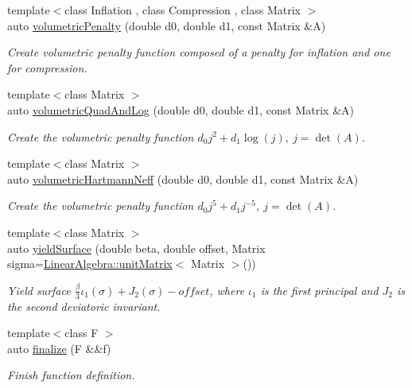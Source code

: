 \begin{DoxyCompactItemize}
{\footnotesize template$<$class Inflation , class Compression , class Matrix $>$ }\\auto \hyperlink{namespaceFunG_ad26faeb264bb4b1cd7e70f3811c366c8}{volumetric\-Penalty} (double d0, double d1, const Matrix \&A)
\begin{DoxyCompactList}\small\item\em Create volumetric penalty function composed of a penalty for inflation and one for compression. \end{DoxyCompactList}\item 
{\footnotesize template$<$class Matrix $>$ }\\auto \hyperlink{namespaceFunG_aaf30b9c36ed86e01b94f6b7c1d95cae8}{volumetric\-Quad\-And\-Log} (double d0, double d1, const Matrix \&A)
\begin{DoxyCompactList}\small\item\em Create the volumetric penalty function $ d_0 j^2 + d_1 \log(j),\ j=\det(A) $. \end{DoxyCompactList}\item 
{\footnotesize template$<$class Matrix $>$ }\\auto \hyperlink{namespaceFunG_adf4be5df85ea9df10cc9e11c11aaeb7b}{volumetric\-Hartmann\-Neff} (double d0, double d1, const Matrix \&A)
\begin{DoxyCompactList}\small\item\em Create the volumetric penalty function $ d_0 j^5 + d_1 j^{-5},\ j=\det(A) $. \end{DoxyCompactList}\item 
{\footnotesize template$<$class Matrix $>$ }\\auto \hyperlink{namespaceFunG_a4784211358c877f05ad9426850303273}{yield\-Surface} (double beta, double offset, Matrix sigma=\hyperlink{group__LinearAlgebraGroup_ga88a596b8526c0ed98ce241244fb85948}{Linear\-Algebra\-::unit\-Matrix}$<$ Matrix $>$())
\begin{DoxyCompactList}\small\item\em Yield surface $ \frac{\beta}{3}\iota_1(\sigma) + J_2(\sigma)-offset $, where $\iota_1$ is the first principal and $J_2$ is the second deviatoric invariant. \end{DoxyCompactList}\item 
{\footnotesize template$<$class F $>$ }\\auto \hyperlink{namespaceFunG_ac59f2ececc3cd451860776320a4a93d5}{finalize} (F \&\&f)
\begin{DoxyCompactList}\small\item\em Finish function definition. \end{DoxyCompactList}\item 

\end{DoxyCompactItemize}

